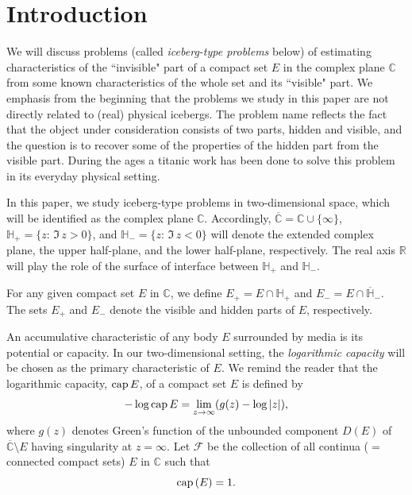 \documentclass[mn,a4paper,fleqn]{w-art}
\newcommand{\CAP}{{\rm cap}\,}
\newcommand{\be}{\begin{equation}}
\newcommand{\ee}{\end{equation}}
\begin{document}

\section{Introduction} \label{Introduction}

We will discuss problems (called {\it iceberg-type problems} below) of estimating
characteristics of the ``invisible" part of a compact set $E$ in the complex plane 
$\mathbb{C}$ from some known characteristics of the whole set and its ``visible" part.
We emphasis from the beginning that the problems we study in this paper are not directly
related to (real) physical icebergs.  The problem name reflects the fact that the 
object under consideration consists of two parts, hidden and visible, and the question
is to recover some of the properties of the hidden part from the visible part. During
the ages a titanic work has been done to solve this problem in its
everyday physical setting.

In this paper, we study iceberg-type problems in two-dimensional
space, which will be identified as the complex plane $\mathbb{C}$.
Accordingly, $\overline{\mathbb{C}}=\mathbb{C}\cup\{\infty\}$,
$\mathbb{H}_+=\{z:\,\Im\,z> 0\}$, and $\mathbb{H}_-=\{z:\,\Im\,z<0\}$
will denote the extended complex plane, the upper half-plane, and
the lower half-plane, respectively. The real axis $\mathbb{R}$
will play the role of the surface of interface between
$\mathbb{H}_+$ and $\mathbb{H}_-$.


For any given compact set $E$ in $\mathbb{C}$, we define $E_+=E\cap
\mathbb{H}_+$ and $E_-=E\cap \overline{\mathbb{H}}_-$. The sets $E_+$ and $E_-$ denote the
visible and hidden parts of $E$, respectively.


An accumulative characteristic of any body $E$ surrounded by media
is its potential or capacity. In our two-dimensional setting, the
\textit{logarithmic capacity} will be chosen as
the primary characteristic of $E$. We remind the reader that
the logarithmic capacity, $\CAP E$, of a compact set $E$ is defined
by %
$$ %
-\log \CAP E =\lim_{z\to \infty}(g(z)-\log|z|),  %
$$  %
where $g(z)$ denotes Green's function of the unbounded component
$D(E)$ of $\overline{\mathbb{C}}\setminus E$ having singularity at
$z=\infty$. Let ${\mathcal{F}}$ be the collection of all continua
($=$ connected compact
sets) $E$ in $\mathbb{C}$ such that  %
$$ %
\CAP(E)=1.  %
$$  %
\end{document}

